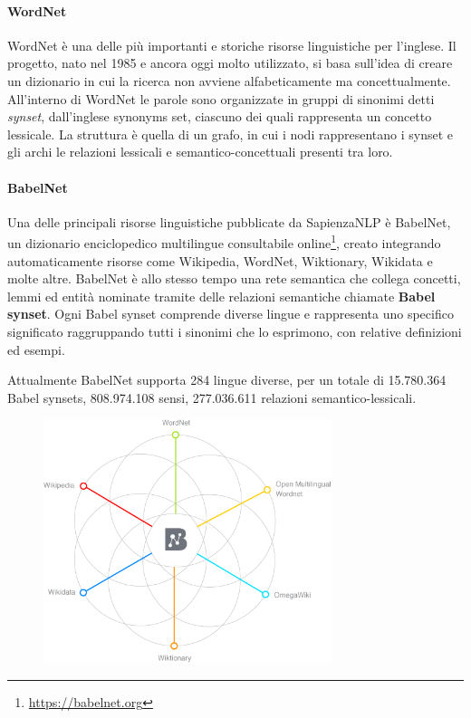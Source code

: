 \paragraph{WordNet \cite{Miller1990}}
WordNet è una delle più importanti e storiche risorse linguistiche per l'inglese.
Il progetto, nato nel 1985 e ancora oggi molto utilizzato, si basa sull'idea
di creare un dizionario in cui la ricerca non avviene alfabeticamente ma concettualmente.
All'interno di WordNet le parole sono organizzate in gruppi di sinonimi detti
\textit{synset}, dall'inglese synonyms set, ciascuno dei quali rappresenta un
concetto lessicale.
La struttura è quella di un grafo, in cui i nodi rappresentano i synset e gli archi
le relazioni lessicali e semantico-concettuali presenti tra loro.

\paragraph{BabelNet \cite{NavigliPonzetto:12aij}}
Una delle principali risorse linguistiche pubblicate da SapienzaNLP è BabelNet,
un dizionario enciclopedico multilingue consultabile online\footnote{\url{https://babelnet.org}},
creato integrando automaticamente risorse come Wikipedia, WordNet, Wiktionary,
Wikidata e molte altre.
BabelNet è allo stesso tempo una rete semantica che collega concetti, lemmi
ed entità nominate tramite delle relazioni semantiche chiamate \textbf{Babel synset}.
Ogni Babel synset comprende diverse lingue e rappresenta uno specifico significato
raggruppando tutti i sinonimi che lo esprimono, con relative definizioni ed esempi.

Attualmente BabelNet supporta 284 lingue diverse, per un totale di 15.780.364
Babel synsets, 808.974.108 sensi, 277.036.611 relazioni semantico-lessicali.

\begin{figure}[ht]
	\centering
	\includegraphics[width=0.75\textwidth]{assets/babelnet.png}
\end{figure}



